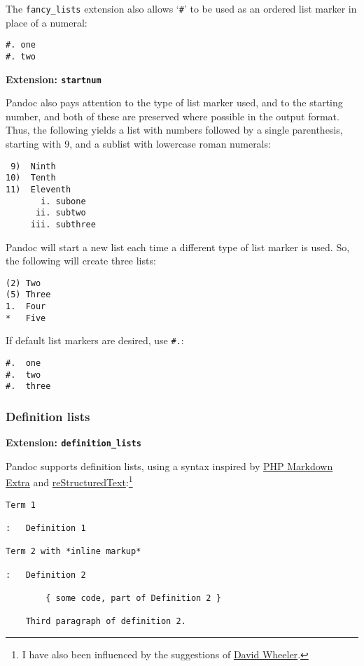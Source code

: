 \documentclass[]{article}
\begin{document}
The \texttt{fancy\_lists} extension also allows `\texttt{\#}' to be used
as an ordered list marker in place of a numeral:

\begin{verbatim}
#. one
#. two
\end{verbatim}

\textbf{Extension: \texttt{startnum}}

Pandoc also pays attention to the type of list marker used, and to the
starting number, and both of these are preserved where possible in the
output format. Thus, the following yields a list with numbers followed
by a single parenthesis, starting with 9, and a sublist with lowercase
roman numerals:

\begin{verbatim}
 9)  Ninth
10)  Tenth
11)  Eleventh
       i. subone
      ii. subtwo
     iii. subthree
\end{verbatim}

Pandoc will start a new list each time a different type of list marker
is used. So, the following will create three lists:

\begin{verbatim}
(2) Two
(5) Three
1.  Four
*   Five
\end{verbatim}

If default list markers are desired, use \texttt{\#.}:

\begin{verbatim}
#.  one
#.  two
#.  three
\end{verbatim}

\subsubsection{Definition lists}\label{definition-lists}

\textbf{Extension: \texttt{definition\_lists}}

Pandoc supports definition lists, using a syntax inspired by
\href{http://www.michelf.com/projects/php-markdown/extra/}{PHP Markdown
Extra} and
\href{http://docutils.sourceforge.net/docs/ref/rst/introduction.html}{reStructuredText}:\footnote{I
  have also been influenced by the suggestions of
  \href{http://www.justatheory.com/computers/markup/modest-markdown-proposal.html}{David
  Wheeler}.}

\begin{verbatim}
Term 1

:   Definition 1

Term 2 with *inline markup*

:   Definition 2

        { some code, part of Definition 2 }

    Third paragraph of definition 2.
\end{verbatim}
\end{document}
